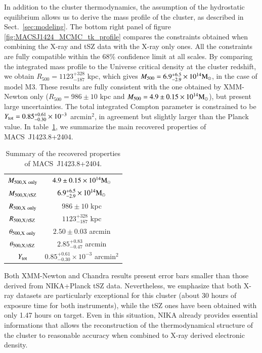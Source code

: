 \documentclass[twocolumn,traditabstract]{aa}
\begin{document}
In addition to the cluster thermodynamics, the assumption of the hydrostatic equilibrium allows us to derive the mass profile of the cluster, as described in Sect.~\ref{sec:modeling}. The bottom right panel of figure \ref{fig:MACSJ1424_MCMC_tk_profile} compares the constraints obtained when combining the X-ray and tSZ data with the X-ray only ones. All the constraints are fully compatible within the 68\% confidence limit at all scales. By comparing the integrated mass profile to the Universe critical density at the cluster redshift, we obtain $R_{500} = 1123^{+328}_{-187}$ kpc, which gives $M_{500} = 6.9^{+6.5}_{-2.9}  \times 10^{14} {\rm M}_{\odot}$, in the case of model M3. These results are fully consistent with the one obtained by XMM-Newton only ($R_{500} = 986 \pm 10$ kpc and $M_{500} = 4.9 \pm 0.15 \times 10^{14} {\rm M}_{\odot}$), but present large uncertainties. The total integrated Compton parameter is constrained to be $Y_{\rm tot} = 0.85^{+0.61}_{-0.30} \times 10^{-3}$ arcmin$^2$, in agreement but slightly larger than the Planck value. In table~\ref{tab:summary}, we summarize the main recovered properties of \mbox{MACS~J1423.8+2404}.
\begin{table}[h]
\caption{Summary of the recovered properties of \mbox{MACS~J1423.8+2404}.}
\begin{center}
\begin{tabular}{cc}
\hline
\hline
$M_{500, {\rm X \ only}}$ & $4.9 \pm 0.15 \times 10^{14} {\rm M}_{\odot}$ \\
$M_{500, {\rm X/tSZ}}$ & $6.9^{+6.5}_{-2.9}  \times 10^{14} {\rm M}_{\odot}$\\
$R_{500, {\rm X \ only}}$ & $986 \pm 10$ kpc\\
$R_{500, {\rm X/tSZ}}$ & $1123^{+328}_{-187}$ kpc\\
$\theta_{500, {\rm X \ only}}$ & $2.50 \pm 0.03$ arcmin \\
$\theta_{500, {\rm X/tSZ}}$ & $2.85^{+0.83}_{-0.47}$ arcmin\\
$Y_{\rm tot}$ & $0.85^{+0.61}_{-0.30} \times 10^{-3}$ arcmin$^2$ \\
\hline
\end{tabular}
\end{center}
\label{tab:summary}
\end{table}

Both XMM-Newton and Chandra results present error bars smaller than those derived from NIKA+Planck tSZ data. Nevertheless, we emphasize that both X-ray datasets are particularly exceptional for this cluster (about 30 hours of exposure time for both instruments), while the tSZ ones have been obtained with only 1.47 hours on target. Even in this situation, NIKA already provides essential informations that allows the reconstruction of the thermodynamical structure of the cluster to reasonable accuracy when combined to X-ray derived electronic density.
\end{document}

